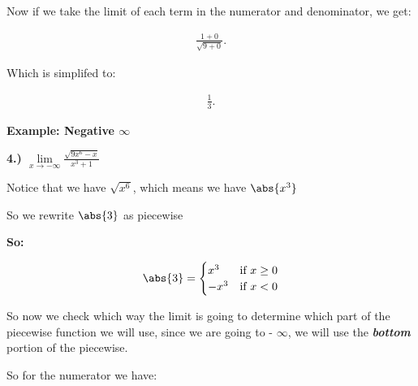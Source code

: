 \documentclass{report}
\begin{document}
        \bigbreak \noindent 
        Now if we take the limit of each term in the numerator and denominator, we get:

        \begin{align*}
            \frac{1+0}{ \sqrt{9+0}}
        .\end{align*}

        \bigbreak \noindent 
        Which is simplifed to:

        \begin{align*}
            \frac{1}{3}
        .\end{align*}

        \bigbreak \noindent \bigbreak \noindent \bigbreak \noindent 
        \begin{large}
            \textbf{Example: Negative $\infty$}
        \end{large}

        \bigbreak \noindent \bigbreak \noindent 
        \textbf{4.) $\lim\limits_{x \to - \infty}{ \frac{ \sqrt{9x^6 - x}}{x^3 + 1}}$}

        \bigbreak \noindent 
        Notice that we have $\sqrt{x^6}$, which means we have $\abs{x^3}$

        \bigbreak \noindent 

        \bigbreak \noindent 
        So we rewrite $\abs{3}$ as piecewise

        \bigbreak \noindent 
        \textbf{So:}

           \begin{equation}
               \abs{3}=
                \begin{cases}
                    x^3 & \text{if } x \geq 0 \\
                    -x^3 & \text{if } x < 0  
                \end{cases}
            \end{equation}

        \bigbreak \noindent 
        So now we check which way the limit is going to determine which part of the piecewise function
        we will use, since we are going to - $\infty$, we will use the \textbf{\textit{bottom}} portion of the 
        piecewise.

        \bigbreak \noindent 
        So for the numerator we have:
\end{document}
